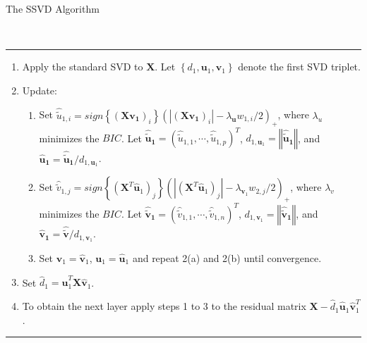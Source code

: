 \begin{bf}The SSVD Algorithm\end{bf}\\
\hspace{-0.1cm} 
\rule{14.75 cm}{1pt}
\begin{enumerate}
 \item Apply the standard SVD to $\mathbf{X}$. Let $\left\{ d_{1}, \mathbf{u}_{1}, \mathbf{v}_{1} \right\}$ denote the first SVD triplet.
 \item Update:
  \begin{enumerate}
   \item Set $\hat{\tilde{u}}_{1,i}=\textit{sign}\left\{(\mathbf{X}\mathbf{v_{1}})_{i}\right\}(|(\mathbf{X}\mathbf{v_{1}})_{i}|-\lambda_{\mathbf{u}}w_{1,i}/2)_{+}$, 		      where $\lambda_{u}$ minimizes the $\textit{BIC}$. 
         Let $\mathbf{\hat{\tilde{u}}_{1}}=(\hat{\tilde{u}}_{1,1},\cdots,\hat{\tilde{u}}_{1,p})^{T}$,
	 $d_{1,\mathbf{u}_{1}}=\left\Vert \mathbf{\hat{\tilde{u}}_{1}} \right\Vert$, 
	 and $\mathbf{\hat{u}_{1}} = \mathbf{\hat{\tilde{u}}_{1}}/d_{1,\mathbf{u}_{1}}$.
   \item Set $\hat{\tilde{v}}_{1,j}=\textit{sign}\left\{(\mathbf{X}^{T}\mathbf{\hat{u}}_{1})_{j}\right\}(|(\mathbf{X}^{T}\mathbf{\hat{u}}_{1})_{j}|-\lambda_{\mathbf{v}_{1}}w_{2,j}/2)_{+}$, where
	 $\lambda_{v}$ minimizes the $\textit{BIC}$. 
         Let $\mathbf{\hat{\tilde{v}}_{1}}=(\hat{\tilde{v}}_{1,1},\cdots,\hat{\tilde{v}}_{1,n})^{T}$,
	 $d_{1,\mathbf{v}_{1}}=\left\Vert \mathbf{\hat{\tilde{v}}_{1}} \right\Vert$, 
	 and $\mathbf{\hat{v}_{1}} =\mathbf{\hat{\tilde{v}}}/d_{1,\mathbf{v}_{1}}$.
   \item Set $\mathbf{v}_{1}=\mathbf{\hat{v}}_{1}$, $\mathbf{u}_{1}=\mathbf{\hat{u}}_{1}$ and repeat 2(a) and 2(b) until convergence.
  \end{enumerate} 
 \item Set $\hat{d}_{1}=\mathbf{\hat{u}}_{1}^{T}\mathbf{X}\mathbf{\hat{v}}_{1}$.
 \item To obtain the next layer apply steps 1 to 3 to the residual matrix $\mathbf{X}-\hat{d}_{1}\mathbf{\hat{u}}_{1}\mathbf{\hat{v}}_{1}^{T}$.
\end{enumerate}
\hspace{-0.1cm} 
\rule{14.75 cm}{1pt}\\
\newpage

